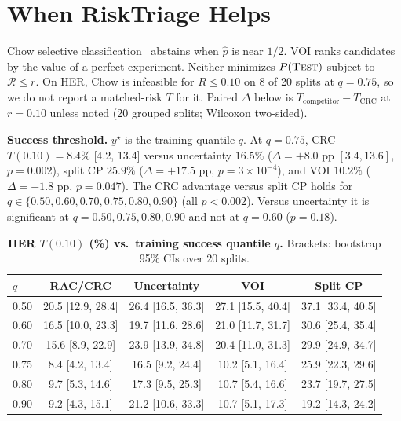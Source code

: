 \documentclass{article}
\newcommand{\test}{\textsc{Test}}
\newcommand{\risk}{\mathcal{R}}
\begin{document}
\section{When RiskTriage Helps}
\label{app:when}

Chow selective classification~\citep{chow1970reject,geifman2017selective} abstains when $\hat p$ is near $1/2$.
VOI ranks candidates by the value of a perfect experiment.
Neither minimizes $P(\test)$ subject to $\risk\le r$.
On HER, Chow is infeasible for $R\le 0.10$ on 8 of 20 splits at $q=0.75$, so we do not report a matched-risk $T$ for it.
Paired $\Delta$ below is $T_{\mathrm{competitor}}-T_{\mathrm{CRC}}$ at $r=0.10$ unless noted (20 grouped splits; Wilcoxon two-sided).

\textbf{Success threshold.}
$y^\star$ is the training quantile $q$.
At $q=0.75$, CRC $T(0.10)=8.4\%$ [4.2, 13.4] versus uncertainty $16.5\%$ ($\Delta=+8.0$ pp $[3.4,13.6]$, $p=0.002$), split CP $25.9\%$ ($\Delta=+17.5$ pp, $p=3{\times}10^{-4}$), and VOI $10.2\%$ ($\Delta=+1.8$ pp, $p=0.047$).
The CRC advantage versus split CP holds for $q\in\{0.50,0.60,0.70,0.75,0.80,0.90\}$ (all $p<0.002$).
Versus uncertainty it is significant at $q=0.50,0.75,0.80,0.90$ and not at $q=0.60$ ($p=0.18$).

\begin{table}[h]
\centering
\caption{\textbf{HER $T(0.10)$ (\%) vs.\ training success quantile $q$.}
Brackets: bootstrap 95\% CIs over 20 splits.}
\label{tab:app_quantile}
\scriptsize
\begin{tabular}{lcccc}
\toprule
$q$ & RAC/CRC & Uncertainty & VOI & Split CP\\
\midrule
0.50 & 20.5 [12.9, 28.4] & 26.4 [16.5, 36.3] & 27.1 [15.5, 40.4] & 37.1 [33.4, 40.5]\\
0.60 & 16.5 [10.0, 23.3] & 19.7 [11.6, 28.6] & 21.0 [11.7, 31.7] & 30.6 [25.4, 35.4]\\
0.70 & 15.6 [8.9, 22.9] & 23.9 [13.9, 34.8] & 20.4 [11.0, 31.3] & 29.9 [24.9, 34.7]\\
0.75 & 8.4 [4.2, 13.4] & 16.5 [9.2, 24.4] & 10.2 [5.1, 16.4] & 25.9 [22.3, 29.6]\\
0.80 & 9.7 [5.3, 14.6] & 17.3 [9.5, 25.3] & 10.7 [5.4, 16.6] & 23.7 [19.7, 27.5]\\
0.90 & 9.2 [4.3, 15.1] & 21.2 [10.6, 33.3] & 10.7 [5.1, 17.3] & 19.2 [14.3, 24.2]\\
\bottomrule
\end{tabular}
\end{table}
\end{document}
